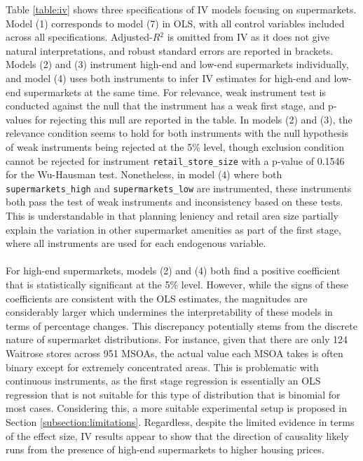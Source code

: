 \documentclass{article}
\begin{document}
Table \ref{table:iv} shows three specifications of IV models focusing on supermarkets. Model (1) corresponds to model (7) in OLS, with all control variables included across all specifications. Adjusted-$R{^2}$ is omitted from IV as it does not give natural interpretations, and robust standard errors are reported in brackets. Models (2) and (3) instrument high-end and low-end supermarkets individually, and model (4) uses both instruments to infer IV estimates for high-end and low-end supermarkets at the same time. For relevance, weak instrument test is conducted against the null that the instrument has a weak first stage, and p-values for rejecting this null are reported in the table. In models (2) and (3), the relevance condition seems to hold for both instruments with the null hypothesis of weak instruments being rejected at the 5\% level, though exclusion condition cannot be rejected for instrument \texttt{retail\_store\_size} with a p-value of 0.1546 for the  Wu-Hausman test. Nonetheless, in model (4) where both \texttt{supermarkets\_high} and \texttt{supermarkets\_low} are instrumented, these instruments both pass the test of weak instruments and inconsistency based on these tests. This is understandable in that planning leniency and retail area size partially explain the variation in other supermarket amenities as part of the first stage, where all instruments are used for each endogenous variable.\\\\
For high-end supermarkets, models (2) and (4) both find a positive coefficient that is statistically significant at the 5\% level. However, while the signs of these coefficients are consistent with the OLS estimates, the magnitudes are considerably larger which undermines the interpretability of these models in terms of percentage changes. This discrepancy potentially stems from the discrete nature of supermarket distributions. For instance, given that there are only 124 Waitrose stores across 951 MSOAs, the actual value each MSOA takes is often binary except for extremely concentrated areas. This is problematic with continuous instruments, as the first stage regression is essentially an OLS regression that is not suitable for this type of distribution that is binomial for most cases. Considering this, a more suitable experimental setup is proposed in Section \ref{subsection:limitations}. Regardless, despite the limited evidence in terms of the effect size, IV results appear to show that the direction of causality likely runs from the presence of high-end supermarkets to higher housing prices.\\\\
\end{document}

